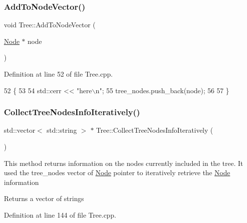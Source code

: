 \subsubsection{\texorpdfstring{Add\+To\+Node\+Vector()}{AddToNodeVector()}}
{\footnotesize\ttfamily void Tree\+::\+Add\+To\+Node\+Vector (\begin{DoxyParamCaption}\item[{\hyperlink{classNode}{Node} $\ast$}]{node }\end{DoxyParamCaption})}



Definition at line 52 of file Tree.\+cpp.


\begin{DoxyCode}
52                                     \{
53   
54   std::cerr << \textcolor{stringliteral}{"here\(\backslash\)n"};
55   tree\_nodes.push\_back(node);
56   
57 \}
\end{DoxyCode}
\mbox{\label{classTree_a9a6309402407a051b346e779169f2ffc}} 
\subsubsection{\texorpdfstring{Collect\+Tree\+Nodes\+Info\+Iteratively()}{CollectTreeNodesInfoIteratively()}}
{\footnotesize\ttfamily std\+::vector$<$ std\+::string $>$ $\ast$ Tree\+::\+Collect\+Tree\+Nodes\+Info\+Iteratively (\begin{DoxyParamCaption}{ }\end{DoxyParamCaption})}

This method returns information on the nodes currently included in the tree. It used the tree\+\_\+nodes vector of \hyperlink{classNode}{Node} pointer to iteratively retrieve the \hyperlink{classNode}{Node} information

\begin{DoxyReturn}{Returns}
a vector of strings 
\end{DoxyReturn}


Definition at line 144 of file Tree.\+cpp.


